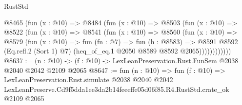 \begin{lexlean}{RustStd}
\begin{coremodule}
          @8465
            (fun (x : @10) =>
            @8484
              (fun (x : @10) =>
              @8503
                (fun (x : @10) =>
                @8522
                  (fun (x : @10) =>
                  @8541
                    (fun (x : @10) =>
                    @8560
                      (fun (x : @10) =>
                      @8579
                        (fun (x : @10) =>
                        fun (fn : @7) =>
                        fun (h : @8583) =>
                        @8591
                          @8592
                          (Eq.refl.{2} (Sort 1) @7)
                          (heq_of_eq.{1} @2050 @8589 @8592 @2065))))))))))))
@8637 := (n : @10) -> (f : @10) -> LexLeanPreservation.Rust.FunSem @2038 @2040 @2042 @2109 @2065
@8647 := fun (n : @10) =>
  fun (f : @10) =>
  LexLeanPreservation.Rust.simulate
    @2038
    @2040
    @2042
    LexLeanPreserve.Cd9f5dda1ee3da2b14feeeffe05d06f85.R4.RustStd.crate_ok
    @2109
    @2065
\end{coremodule}
\end{lexlean}
